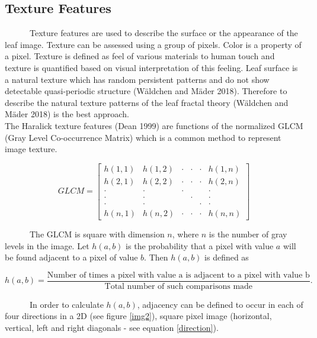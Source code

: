 \documentclass{article}
\begin{document}
\hypertarget{texture-features}{%
\subsection{Texture Features}\label{texture-features}}

~~~~~~Texture features are used to describe the surface or the
appearance of the leaf image. Texture can be assessed using a group of
pixels. Color is a property of a pixel. Texture is defined as feel of
various materials to human touch and texture is quantified based on
visual interpretation of this feeling. Leaf surface is a natural texture
which has random persistent patterns and do not show detectable
quasi-periodic structure (Wäldchen and Mäder 2018). Therefore to
describe the natural texture patterns of the leaf fractal theory
(Wäldchen and Mäder 2018) is the best approach.\\
\hspace*{0.333em}\hspace*{0.333em}\hspace*{0.333em}\hspace*{0.333em}\hspace*{0.333em}\hspace*{0.333em}The
Haralick texture features (Dean 1999) are functions of the normalized
GLCM (Gray Level Co-occurrence Matrix) which is a common method to
represent image texture.

\[GLCM = \begin{bmatrix}
h(1,1) & h(1,2)  & \cdot &\cdot &\cdot & h(1,n) \\ 
h(2,1) & h(2,2)  & \cdot &\cdot &\cdot & h(2,n) \\ 
\cdot  & \cdot & \cdot  & & &\cdot\\ 
\cdot  & \cdot &  & \cdot& &\cdot\\ 
\cdot  & \cdot &  & & \cdot &\cdot\\ 
h(n,1) & h(n,2) & \cdot &\cdot &\cdot & h(n,n)
\end{bmatrix}\]

~~~~~~The GLCM is square with dimension \(n\), where \(n\) is the number
of gray levels in the image. Let \(h(a,b)\) is the probability that a
pixel with value \(a\) will be found adjacent to a pixel of value \(b\).
Then \(h(a,b)\) is defined as

\[h(a,b) = \frac{\text{Number of times a pixel with value a is adjacent to a pixel with value b}}{\text{Total number of such comparisons made}}.\]

~~~~~~In order to calculate \(h(a,b)\), adjacency can be defined to
occur in each of four directions in a 2D (see figure \ref{img2}), square
pixel image (horizontal, vertical, left and right diagonals - see
equation \ref{direction}).
\end{document}
